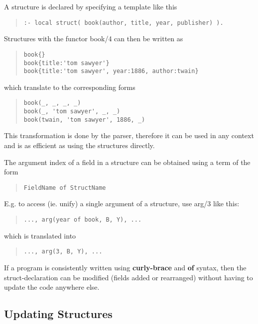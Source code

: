 A structure is declared by specifying a template like this
\begin{quote}\begin{verbatim}
:- local struct( book(author, title, year, publisher) ).
\end{verbatim}\end{quote}
Structures with the functor book/4 can then be written as
\begin{quote}\begin{verbatim}
book{}
book{title:'tom sawyer'}
book{title:'tom sawyer', year:1886, author:twain}
\end{verbatim}\end{quote}
which translate to the corresponding forms
\begin{quote}\begin{verbatim}
book(_, _, _, _)
book(_, 'tom sawyer', _, _)
book(twain, 'tom sawyer', 1886, _)
\end{verbatim}\end{quote}
This transformation is done by the parser, therefore it can
be used in any context and is as efficient as using the structures
directly.

The argument index of a field in a structure can be obtained
using a term of the form
\begin{quote}\begin{verbatim}
FieldName of StructName
\end{verbatim}\end{quote}
E.g. to access (ie. unify) a single argument of a structure,
use arg/3 like this:
\begin{quote}\begin{verbatim}
..., arg(year of book, B, Y), ...
\end{verbatim}\end{quote}
which is translated into
\begin{quote}\begin{verbatim}
..., arg(3, B, Y), ...
\end{verbatim}\end{quote}

If a program is consistently written using {\bf curly-brace} and {\bf of}
syntax, then the struct-declaration can be modified (fields added or
rearranged) without having to update the code anywhere else.


\subsection{Updating Structures}

